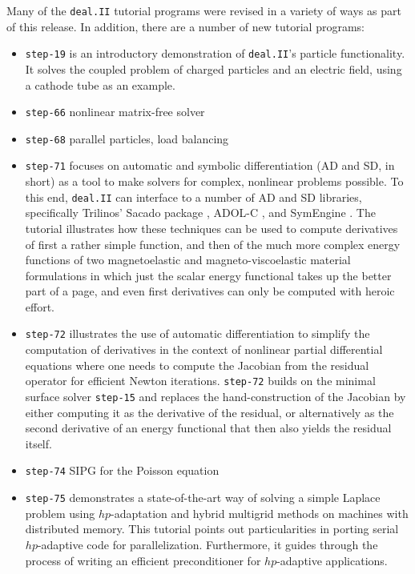 \documentclass{ansarticle-preprint}
\newcommand{\specialword}[1]{\texttt{#1}}
\newcommand{\dealii}{{\specialword{deal.II}}\xspace}
\begin{document}
Many of the \dealii{} tutorial programs were revised in a variety of
ways as part of this release. In addition, there are a number of new tutorial programs:
\begin{itemize}
\item \texttt{step-19} is an introductory demonstration of \dealii{}'s
  particle functionality. It solves the coupled problem of
  charged particles and an electric field, using a cathode tube as an
  example.

\item \texttt{step-66} nonlinear matrix-free solver 
  
\item \texttt{step-68} parallel particles, load balancing 
  
\item \texttt{step-71} focuses on automatic and symbolic
  differentiation (AD and SD, in short) as a tool to make solvers for complex,
  nonlinear problems possible. To this end, \dealii{} can interface to a number
  of AD and SD libraries, specifically Trilinos' Sacado package
  \cite{Bartlett2006a}, ADOL-C \cite{Griewank1996a}, and
  SymEngine \cite{symengine-web-page}. The tutorial
  illustrates how these techniques can be used to compute derivatives
  of first a rather simple function, and then of the much more complex
  energy functions of two magnetoelastic and magneto-viscoelastic
  material formulations in which just the scalar energy functional
  takes up the better part of a page, and even first derivatives can
  only be computed with heroic effort.

\item \texttt{step-72} illustrates the use of automatic
  differentiation to simplify the computation of derivatives in the
  context of nonlinear partial differential equations where one needs
  to compute the Jacobian from the residual operator for efficient
  Newton iterations. \texttt{step-72} builds on the minimal surface
  solver \texttt{step-15} and replaces the hand-construction of the
  Jacobian by either computing it as the derivative of the residual,
  or alternatively as the second derivative of an energy functional
  that then also yields the residual itself.

\item \texttt{step-74} SIPG for the Poisson equation 
  
\item \texttt{step-75} demonstrates a state-of-the-art way of solving a simple
      Laplace problem using $hp$-adaptation and hybrid multigrid methods on machines
      with distributed memory. This tutorial points out particularities in porting
      serial $hp$-adaptive code for parallelization. Furthermore, it guides through
      the process of writing an efficient preconditioner for $hp$-adaptive applications.


\end{itemize}
\end{document}
